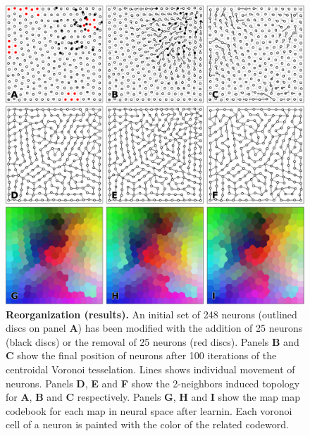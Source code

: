 \begin{figure}
  \includegraphics[width=\columnwidth]{experiment-reorganization.pdf}
  \caption{%
  {\bfseries \sffamily Reorganization (results).}
  An initial set of 248 neurons (outlined discs on panel \textbf{A}) has been modified with the addition of 25 neurons (black discs) or the removal of 25 neurons (red discs). Panels \textbf{B} and \textbf{C} show the final position of neurons after 100 iterations of the centroidal Voronoi tesselation. Lines shows individual movement of neurons. Panels \textbf{D}, \textbf{E} and \textbf{F} show the 2-neighbors induced topology for \textbf{A}, \textbf{B} and \textbf{C} respectively. Panels \textbf{G}, \textbf{H} and \textbf{I} show the map
  map codebook for each map in neural space after learnin. Each voronoi cell of a neuron is painted with the color of the related codeword.
  }
  \label{fig:reorganization:results}
\end{figure}
